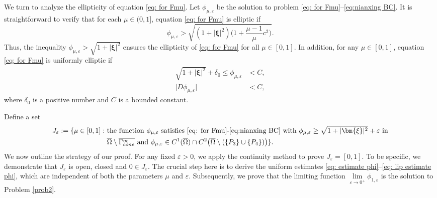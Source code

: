 \documentclass[reqno,12pt]{amsart}
\numberwithin{equation}{section}
\begin{document}
We turn to analyze the ellipticity of equation \eqref{eq: for Fmu}. Let $\phi_{\mu,\varepsilon}$ be the solution to problem \eqref{eq: for Fmu}--\eqref{eq:nianxing BC}. It is straightforward to verify that for each $\mu\in(0,1]$, equation \eqref{eq: for Fmu} is elliptic if
\begin{equation*}
	\phi_{\mu,\varepsilon}>\sqrt{(1+|\bm{\xi}|^2)\Big(1+\frac{\mu-1}{\mu}c^2\Big)}.
\end{equation*}
Thus, the inequality $\phi_{\mu,\varepsilon} > \sqrt{1+|\bm{\xi}|^2}$ ensures the ellipticity of \eqref{eq: for Fmu} for all $\mu\in[0,1]$. In addition, for any $\mu\in[0,1]$, equation \eqref{eq: for Fmu} is uniformly elliptic if
\begin{align}
	\sqrt{1+|\bm{\xi}|^2}+\delta_{0}\leq  \phi_{\mu,\varepsilon}&<C,\label{eq: estimate phi}\\
	\vert D\phi_{\mu,\varepsilon}\vert&<C,\label{eq: lip estimate phi}
\end{align}
where $\delta_{0}$ is a positive number and $C$ is a bounded constant.

Define a set
\begin{equation}\label{eq: J varepsilon}
	\begin{aligned}
		J_{\varepsilon}:=\{\mu\in[0,1]:~&\text{the function }\phi_{\mu,\varepsilon} ~\text{satisfies}~\eqref{eq: for Fmu}\text{-}\eqref{eq:nianxing BC}~\text{with}~\phi_{\mu,\varepsilon}\geq \sqrt{1+\vert\bm{\xi}\vert^2}+\varepsilon~\text{in}\\		&\overline{\Omega}\setminus\overline{\Gamma_{cone}^{\infty}}~\text{and}~\phi_{\mu,\varepsilon}\in C^{1}(\overline{\Omega})\cap C^2\big(\overline{\Omega}\setminus(\{P_3\}\cup\{P_4\})\big)\}.
	\end{aligned}
\end{equation}
We now outline the strategy of our proof. For any fixed $\varepsilon>0$, we apply the continuity method to prove $J_{\varepsilon}=[0,1]$. To be specific, we demonstrate that $J_{\varepsilon}$ is open, closed and $0\in J_{\varepsilon}$. The crucial step here is to derive the uniform estimates \eqref{eq: estimate phi}--\eqref{eq: lip estimate phi}, which are independent of both the parameters $\mu$ and $\varepsilon$. Subsequently, we prove that the limiting function $\mathop{\mathrm{lim}}\limits_{\varepsilon \to 0^+} \phi_{1,\varepsilon}$ is the solution to Problem \ref{prob2}.
\end{document}
